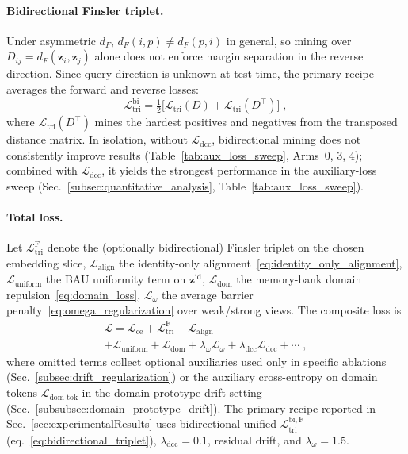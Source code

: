\paragraph{Bidirectional Finsler triplet.} 
Under asymmetric $d_F$, $d_F(i,p)\neq d_F(p,i)$ in general, so mining over $D_{ij}=d_F(\mathbf{z}_i,\mathbf{z}_j)$ alone does not enforce margin separation in the reverse direction. Since query direction is unknown at test time, the primary recipe averages the forward and reverse losses:
\begin{equation}
    \mathcal{L}_{\mathrm{tri}}^{\mathrm{bi}} = \tfrac{1}{2}\bigl[\mathcal{L}_{\mathrm{tri}}(D) + \mathcal{L}_{\mathrm{tri}}(D^\top)\bigr] \;,
    \label{eq:bidirectional_triplet}
\end{equation}
where $\mathcal{L}_{\mathrm{tri}}(D^\top)$ mines the hardest positives and negatives from the transposed distance matrix. In isolation, without $\mathcal{L}_{\mathrm{dcc}}$, bidirectional mining does not consistently improve results (Table~\ref{tab:aux_loss_sweep}, Arms~0, 3, 4); combined with $\mathcal{L}_{\mathrm{dcc}}$, it yields the strongest performance in the auxiliary-loss sweep (Sec.~\ref{subsec:quantitative_analysis}, Table~\ref{tab:aux_loss_sweep}).

\paragraph{Total loss.}
Let $\mathcal{L}_{\mathrm{tri}}^{\mathrm{F}}$ denote the (optionally bidirectional) Finsler triplet on the chosen embedding slice, $\mathcal{L}_{\mathrm{align}}$ the identity-only alignment~\eqref{eq:identity_only_alignment}, $\mathcal{L}_{\mathrm{uniform}}$ the BAU uniformity term on $\mathbf{z}^{\mathrm{id}}$, $\mathcal{L}_{\mathrm{dom}}$ the memory-bank domain repulsion~\eqref{eq:domain_loss}, $\mathcal{L}_\omega$ the average barrier penalty~\eqref{eq:omega_regularization} over weak/strong views. The composite loss is
\begin{multline}
    \mathcal{L} = \mathcal{L}_{\mathrm{ce}}
    + \mathcal{L}_{\mathrm{tri}}^{\mathrm{F}}
    + \mathcal{L}_{\mathrm{align}} \\
    + \mathcal{L}_{\mathrm{uniform}}
    + \mathcal{L}_{\mathrm{dom}} 
    + \lambda_\omega\mathcal{L}_\omega
    + \lambda_{\mathrm{dcc}} \mathcal{L}_{\mathrm{dcc}}
    + \cdots \;,
    \label{eq:total_loss}
\end{multline}
where omitted terms collect optional auxiliaries used only in specific ablations (Sec.~\ref{subsec:drift_regularization}) or the auxiliary cross-entropy on domain tokens $\mathcal{L}_{\mathrm{dom\text{-}tok}}$ in the domain-prototype drift setting (Sec.~\ref{subsubsec:domain_prototype_drift}). The primary recipe reported in Sec.~\ref{sec:experimentalResults} uses bidirectional unified $\mathcal{L}_{\mathrm{tri}}^{\mathrm{bi, F}}$ (eq.~\ref{eq:bidirectional_triplet}), $\lambda_{\mathrm{dcc}}{=}0.1$, residual drift, and $\lambda_\omega{=}1.5$.

